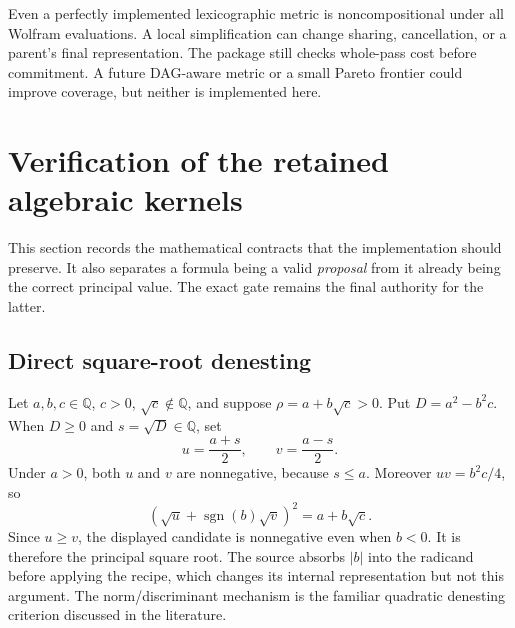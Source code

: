 \documentclass[11pt,a4paper]{article}
\newcommand{\Q}{\mathbb Q}\newcommand{\C}{\mathbb C}
\theoremstyle{definition}\newtheorem{definition}[proposition]{Definition}
\theoremstyle{remark}\newtheorem{remark}[proposition]{Remark}
\begin{document}
Even a perfectly implemented lexicographic metric is noncompositional under
all Wolfram evaluations. A local simplification can change sharing, cancellation,
or a parent's final representation. The package still checks whole-pass cost
before commitment. A future DAG-aware metric or a small Pareto frontier could
improve coverage, but neither is implemented here.

\section{Verification of the retained algebraic kernels}

This section records the mathematical contracts that the implementation should
preserve. It also separates a formula being a valid \emph{proposal} from it
already being the correct principal value. The exact gate remains the final
authority for the latter.

\subsection{Direct square-root denesting}
Let $a,b,c\in\Q$, $c>0$, $\sqrt c\notin\Q$, and suppose
$\rho=a+b\sqrt c>0$. Put $D=a^2-b^2c$. When $D\ge0$ and $s=\sqrt D\in\Q$,
set
\begin{equation}
 u=\frac{a+s}{2},\qquad v=\frac{a-s}{2}.
\end{equation}
Under $a>0$, both $u$ and $v$ are nonnegative, because $s\le a$. Moreover
$uv=b^2c/4$, so
\begin{equation}
 \left(\sqrt u+\operatorname{sgn}(b)\sqrt v\right)^2
 =a+b\sqrt c.
\end{equation}
Since $u\ge v$, the displayed candidate is nonnegative even when $b<0$.
It is therefore the principal square root. The source absorbs $|b|$ into the
radicand before applying the recipe, which changes its internal representation
but not this argument. The norm/discriminant mechanism is the familiar
quadratic denesting criterion discussed in the literature.\cite{bfht,jeffrey}
\end{document}
